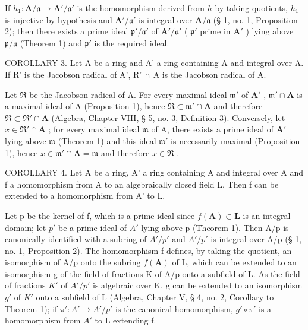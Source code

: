 If \(h_1 \colon \mathbf{A} / \mathfrak{a} \to \mathbf{A}' / \mathfrak{a}'\) is the homomorphism derived from \(h\) by taking quotients, \(h_1\) is injective by hypothesis and \(\mathbf{A}' / \mathfrak{a}'\) is integral over \(\mathbf{A} / \mathfrak{a}\) (§ 1, no. 1, Proposition 2); then there exists a prime ideal \(\mathfrak{p}' / \mathfrak{a}'\) of \(\mathbf{A}' / \mathfrak{a}'\) ( \(\mathfrak{p}'\) prime in \(\mathbf{A}'\) ) lying above \(\mathfrak{p} / \mathfrak{a}\) (Theorem 1) and \(\mathfrak{p}'\) is the required ideal.

COROLLARY 3. Let A be a ring and A' a ring containing A and integral over A. If R' is the Jacobson radical of A', R' ∩ A is the Jacobson radical of A.

Let \(\mathfrak{R}\) be the Jacobson radical of A. For every maximal ideal \(\mathfrak{m}'\) of \(\mathbf{A}'\) , \(\mathfrak{m}' \cap \mathbf{A}\) is a maximal ideal of A (Proposition 1), hence \(\mathfrak{R} \subset \mathfrak{m}' \cap \mathbf{A}\) and therefore \(\mathfrak{R} \subset \mathfrak{R}' \cap \mathbf{A}\) (Algebra, Chapter VIII, § 5, no. 3, Definition 3). Conversely, let \(x \in \mathfrak{R}' \cap \mathbf{A}\) ; for every maximal ideal \(\mathfrak{m}\) of A, there exists a prime ideal of \(\mathbf{A}'\) lying above \(\mathfrak{m}\) (Theorem 1) and this ideal \(\mathfrak{m}'\) is necessarily maximal (Proposition 1), hence \(x \in \mathfrak{m}' \cap \mathbf{A} = \mathfrak{m}\) and therefore \(x \in \mathfrak{R}\) .

COROLLARY 4. Let A be a ring, A' a ring containing A and integral over A and f a homomorphism from A to an algebraically closed field L. Then f can be extended to a homomorphism from A' to L.

Let p be the kernel of f, which is a prime ideal since \(f(\mathbf{A}) \subset \mathbf{L}\) is an integral domain; let \(p'\) be a prime ideal of \(A'\) lying above p (Theorem 1). Then A/p is canonically identified with a subring of \(A'/p'\) and \(A'/p'\) is integral over A/p (§ 1, no. 1, Proposition 2). The homomorphism f defines, by taking the quotient, an isomorphism of A/p onto the subring \(f(\mathbf{A})\) of L, which can be extended to an isomorphism g of the field of fractions K of A/p onto a subfield of L. As the field of fractions \(K'\) of \(A'/p'\) is algebraic over K, g can be extended to an isomorphism \(g'\) of \(K'\) onto a subfield of L (Algebra, Chapter V, § 4, no. 2, Corollary to Theorem 1); if \(\pi': A' \to A'/p'\) is the canonical homomorphism, \(g' \circ \pi'\) is a homomorphism from \(A'\) to L extending f.

